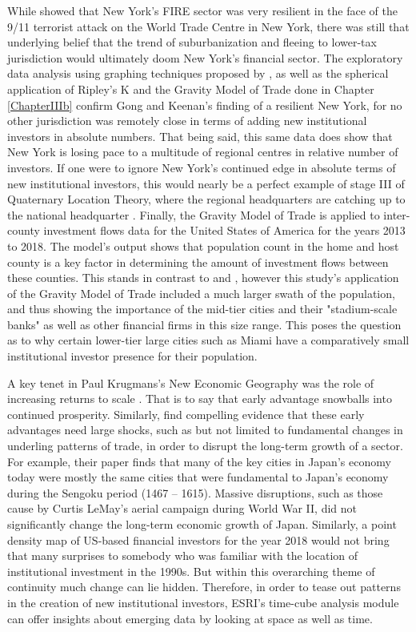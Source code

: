 While \cite{gongthe2012} showed that New York's FIRE sector was very resilient in the face of the 9/11 terrorist attack on the World Trade Centre in New York, there was still that underlying belief that the trend of suburbanization and fleeing to lower-tax jurisdiction would ultimately doom New York's financial sector.  The exploratory data analysis using graphing techniques proposed by  \cite{tufte1998visual}, as well as the spherical application of Ripley's K and the Gravity Model of Trade done in Chapter \ref{ChapterIIIb} confirm Gong and Keenan's finding of a resilient New York, for no other jurisdiction was remotely close in terms of adding new institutional investors in absolute numbers.  That being said, this same data does show that New York is losing pace to a multitude of regional centres in relative number of investors.  If one were to ignore New York's continued edge in absolute terms of new institutional investors, this would nearly be a perfect example of stage III of Quaternary Location Theory, where the regional headquarters are catching up to the national headquarter \citep{Semple_Phipps82}.  Finally, the Gravity Model of Trade is applied to inter-county investment flows data for the United States of America for the years 2013 to 2018.  The model's output shows that population count in the home and host county is a key factor in determining the amount of investment flows between these counties.  This stands in contrast to \cite{greena1993} and \cite{GreenOLef2014}, however this study's application of the Gravity Model of Trade included a much larger swath of the population, and thus showing the importance of the mid-tier cities and their "stadium-scale banks" as well as other financial firms in this size range. This poses the question as to why certain lower-tier large cities such as Miami have a comparatively small institutional investor presence for their population.  

A key tenet in Paul Krugmans's New Economic Geography was the role of increasing returns to scale \citep{krugman1991increasing}.  That is to say that early advantage snowballs into continued prosperity.  Similarly, \cite{davis2002bones} find compelling evidence that these early advantages need large shocks, such as but not limited to fundamental changes in underling patterns of trade, in order to disrupt the long-term growth of a sector.  For example, their paper finds that many of the key cities in Japan's economy today were mostly the same cities that were fundamental to Japan's economy during the Sengoku period (1467 -- 1615).  Massive disruptions, such as those cause by Curtis LeMay's aerial campaign during World War II, did not significantly change the long-term economic growth of Japan.  Similarly, a point density map of US-based financial investors for the year 2018 would not bring that many surprises to somebody who was familiar with the location of institutional investment in the 1990s.  But within this overarching theme of continuity much change can lie hidden.  Therefore, in order to tease out patterns in the creation of new institutional investors, ESRI's time-cube analysis module can offer insights about emerging data by looking at space as well as time. 

